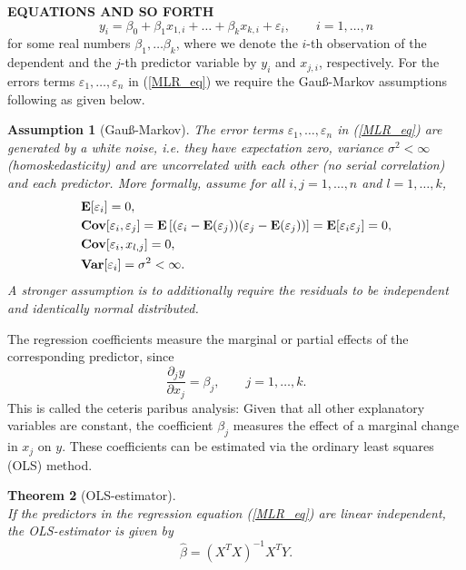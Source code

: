 \documentclass[a4paper, 12pt]{scrreprt}
\newtheorem{Theorem}{Theorem}[chapter]
\newtheorem{Assumption}[Theorem]{Assumption}
\newcommand{\ew}{\mbox{\textbf{E}}}
\newcommand{\var}{\mbox{\textbf{Var}}}
\newcommand{\cov}{\mbox{\textbf{Cov}}}
\begin{document}
\textbf{EQUATIONS AND SO FORTH}
\begin{equation}\label{MLR_eq}
y_i = \beta_0 + \beta_1 x_{1,i} + \ldots + \beta_k x_{k,i} + \varepsilon_i, \qquad i=1,\ldots, n
\end{equation}
for some real numbers $\beta_1, \ldots \beta_k$, where we denote the $i$-th observation of the dependent and the $j$-th predictor variable by $y_i$ and $x_{j,i}$, respectively. 
For the errors terms $\varepsilon_1, \ldots, \varepsilon_n$ in (\ref{MLR_eq}) we require the Gauß-Markov assumptions following as given below.

\begin{Assumption}[Gauß-Markov] \upshape \label{assumption:gauss}
The error terms $\varepsilon_1, \ldots, \varepsilon_n$ in (\ref{MLR_eq}) are generated by a white noise, i.e. they have expectation zero, variance $\sigma^2 < \infty$ (homoskedasticity) and are uncorrelated with each other (no serial correlation) and each predictor. More formally, assume for all $i,j = 1,\ldots, n$ and $l=1,\ldots,k$,	
	\begin{align}
	& \ew[\varepsilon_i] = 0, \\
	&\cov[\varepsilon_i, \varepsilon_j] = \ew \left[ (\varepsilon_i - \ew(\varepsilon_j)) (\varepsilon_j - \ew(\varepsilon_j)) \right] = \ew[\varepsilon_i \varepsilon_j] = 0, \\
	&\cov[\varepsilon_i, x_{l,j}] = 0, \\
	& \var[\varepsilon_i] = \sigma^2 < \infty.
	\end{align}
A stronger assumption is to additionally require the residuals to be independent and identically normal distributed.
\end{Assumption}

The regression coefficients measure the marginal or partial effects of the corresponding predictor, since
\begin{equation}
\frac{\partial_j y}{\partial x_j} = \beta_j, \qquad j=1,\ldots,k. 
\end{equation}
This is called the ceteris paribus analysis: Given that all other explanatory variables are constant, the coefficient $\beta_j$ measures the effect of a marginal change in $x_j$ on $y$.
These coefficients can be estimated via the ordinary least squares (OLS) method. 

\begin{Theorem}[OLS-estimator] \upshape $\text{ }$ \\
If the predictors in the regression equation (\ref{MLR_eq}) are linear independent, the OLS-estimator is given by 
\begin{equation}\label{OLS}
\hat{\beta} = (X^T X)^{-1} X^T Y.
\end{equation}
\end{Theorem}
\end{document}
